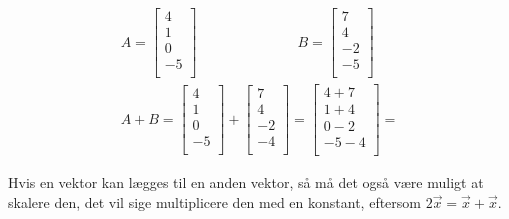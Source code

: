 \begin{eks}
\begin{align*}
A=
\begin{bmatrix}
4\\
1\\
0\\
-5\\
\end{bmatrix}
\hspace{3cm}
B=
\begin{bmatrix}
7\\
4\\
-2\\
-5\\
\end{bmatrix}\\
A+B=
\begin{bmatrix}
4\\
1\\
0\\
-5\\
\end{bmatrix}
+
\begin{bmatrix}
7\\
4\\
-2\\
-4\\
\end{bmatrix}
=
\begin{bmatrix}
4+7\\
1+4\\
0-2\\
-5-4\\
\end{bmatrix}
=
\end{align*}
\end{eks}
Hvis en vektor kan lægges til en anden vektor, så må det også være muligt at skalere den, det vil sige multiplicere den med en konstant, eftersom $2\vec{x}=\vec{x}+\vec{x}$.\\

